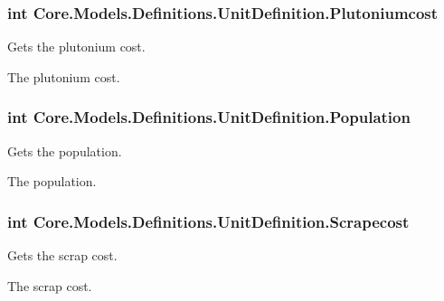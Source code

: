 \subsubsection[{Plutoniumcost}]{\setlength{\rightskip}{0pt plus 5cm}int Core.\+Models.\+Definitions.\+Unit\+Definition.\+Plutoniumcost\hspace{0.3cm}{\ttfamily [get]}}\label{classCore_1_1Models_1_1Definitions_1_1UnitDefinition_acf9bdfe102042bfc92207d6e08fcf995}


Gets the plutonium cost. 

The plutonium cost.\hypertarget{classCore_1_1Models_1_1Definitions_1_1UnitDefinition_a748b77e28ada4746ed63b0f02e3500b0}{}
\subsubsection[{Population}]{\setlength{\rightskip}{0pt plus 5cm}int Core.\+Models.\+Definitions.\+Unit\+Definition.\+Population\hspace{0.3cm}{\ttfamily [get]}}\label{classCore_1_1Models_1_1Definitions_1_1UnitDefinition_a748b77e28ada4746ed63b0f02e3500b0}


Gets the population. 

The population.\hypertarget{classCore_1_1Models_1_1Definitions_1_1UnitDefinition_a3f72b3b6dc4fdffa692d7545fd2fac6e}{}
\subsubsection[{Scrapecost}]{\setlength{\rightskip}{0pt plus 5cm}int Core.\+Models.\+Definitions.\+Unit\+Definition.\+Scrapecost\hspace{0.3cm}{\ttfamily [get]}}\label{classCore_1_1Models_1_1Definitions_1_1UnitDefinition_a3f72b3b6dc4fdffa692d7545fd2fac6e}


Gets the scrap cost. 

The scrap cost.\hypertarget{classCore_1_1Models_1_1Definitions_1_1UnitDefinition_a33eddf22531ef2f351a5efd21733c276}{}
